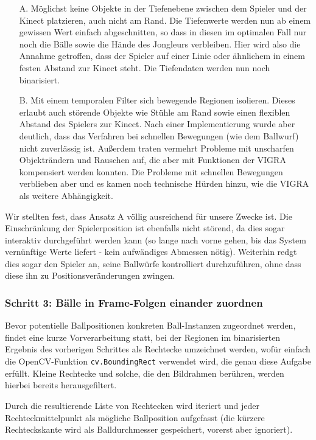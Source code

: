 \documentclass[12pt,a4paper,ngerman]{scrartcl}
\begin{document}
\begin{itemize}
\item[A.]Möglichst keine Objekte in der Tiefenebene zwischen dem Spieler und der Kinect platzieren, auch nicht am Rand. Die Tiefenwerte
werden nun ab einem gewissen Wert einfach abgeschnitten, so dass in diesen im optimalen Fall nur noch die Bälle sowie die Hände des
Jongleurs verbleiben. Hier wird also die Annahme getroffen, dass der Spieler auf einer Linie oder ähnlichem in einem festen Abstand zur
Kinect steht. Die Tiefendaten werden nun noch binarisiert.
\item[B.]Mit einem temporalen Filter sich bewegende Regionen isolieren. Dieses erlaubt auch störende Objekte wie Stühle am Rand sowie
einen flexiblen Abstand des Spielers zur Kinect. Nach einer Implementierung wurde aber deutlich, dass das Verfahren bei schnellen Bewegungen
(wie dem Ballwurf) nicht zuverlässig ist. Außerdem traten vermehrt Probleme mit unscharfen Objekträndern und Rauschen auf, die aber mit Funktionen der VIGRA\cite{vigra} kompensiert werden konnten. Die Probleme mit schnellen Bewegungen verblieben aber und es kamen noch technische Hürden hinzu, wie die VIGRA\cite{vigra} als weitere Abhängigkeit.
\end{itemize}

Wir stellten fest, dass Ansatz A völlig ausreichend für unsere Zwecke ist. Die Einschränkung der Spielerposition ist ebenfalls nicht störend, da dies sogar interaktiv durchgeführt werden kann (so lange nach vorne gehen, bis das System vernünftige Werte liefert - kein aufwändiges Abmessen nötig). Weiterhin redgt dies sogar den Spieler an, seine Ballwürfe kontrolliert durchzuführen, ohne dass diese ihn zu Positionsveränderungen zwingen.

\subsubsection{Schritt 3: Bälle in Frame-Folgen einander zuordnen}

Bevor potentielle Ballpositionen konkreten Ball-Instanzen zugeordnet werden, findet eine kurze Vorverarbeitung statt, bei der Regionen im binarisierten Ergebnis des vorherigen Schrittes als Rechtecke umzeichnet werden, wofür einfach die OpenCV-Funktion \lstinline{cv.BoundingRect} verwendet wird, die genau diese Aufgabe erfüllt.
Kleine Rechtecke und solche, die den Bildrahmen berühren, werden hierbei bereits herausgefiltert.

Durch die resultierende Liste von Rechtecken wird iteriert und jeder
Rechteckmittelpunkt als mögliche Ballposition aufgefasst (die kürzere Rechteckskante
wird als Balldurchmesser gespeichert, vorerst aber ignoriert).
\end{document}
